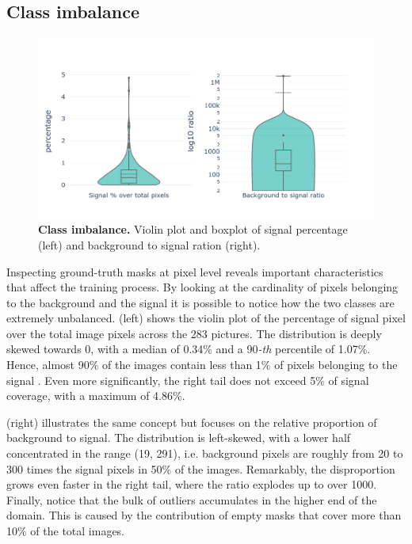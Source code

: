 \subsection{Class imbalance}
\label{sec:class_imbalance}
\begin{figure}
    \centering
    \includegraphics[width=\textwidth]{figures/120_dataset/class_imbalance.png}
    \caption{\textbf{Class imbalance.} Violin plot and boxplot of signal percentage (left) and background to signal ration (right).}
    \label{fig:dataset:class_imbalance}
\end{figure}

Inspecting ground-truth masks at pixel level reveals important characteristics that affect the training process. 
By looking at the cardinality of pixels belonging to the background and the signal it is possible to notice how the two classes are extremely unbalanced.
 (left) shows the violin plot of the percentage of signal pixel over the total image pixels across the 283 pictures.
The distribution is deeply skewed towards 0, with a median of 0.34\% and a 90\emph{-th} percentile of 1.07\%. 
Hence, almost 90\% of the images contain less than 1\% of pixels belonging to the signal%
.
Even more significantly, the right tail does not exceed 5\% of signal coverage, with a maximum of 4.86\%.

 (right) illustrates the same concept but focuses on the relative proportion of background to signal. 
The distribution is left-skewed, with a lower half concentrated in the range (19, 291), i.e. background pixels are roughly from 20 to 300 times the signal pixels in 50\% of the images.
Remarkably, the disproportion grows even faster in the right tail, where the ratio explodes up to over 1000. 
Finally, notice that the bulk of outliers accumulates in the higher end of the domain. 
This is caused by the contribution of empty masks that cover more than 10\% of the total images.

